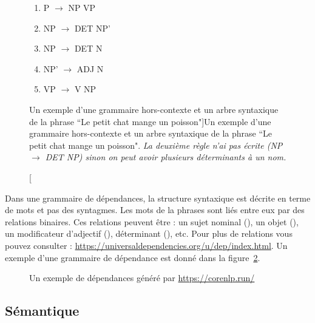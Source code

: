 \documentclass{KodeBook}
\begin{document}
\begin{figure}[ht]
	\centering
	\begin{minipage}{0.3\textwidth}
		\begin{enumerate}
			\item P $ \rightarrow $ NP VP
			\item NP $ \rightarrow $ DET NP'
			\item NP $ \rightarrow $ DET N
			\item NP' $ \rightarrow $ ADJ N
			\item VP $ \rightarrow $ V NP
		\end{enumerate}
	\end{minipage}
	\begin{minipage}{0.3\textwidth}
	\end{minipage}

	\caption[Un exemple d'une grammaire hors-contexte et un arbre syntaxique de la phrase ``Le petit chat mange un poisson"]{Un exemple d'une grammaire hors-contexte et un arbre syntaxique de la phrase ``Le petit chat mange un poisson". \textit{La deuxième règle n'ai pas écrite (NP $ \rightarrow $ DET NP) sinon on peut avoir plusieurs déterminants à un nom.}\label{fig.exp-gram-const}}

\end{figure}

Dans une grammaire de dépendances, la structure syntaxique est décrite en terme de mots et pas des syntagmes.
Les mots de la phrases sont liés entre eux par des relations binaires. 
Ces relations peuvent être : un sujet nominal (), un objet (), un modificateur d'adjectif (), déterminant (), etc.
Pour plus de relations vous pouvez consulter : \url{https://universaldependencies.org/u/dep/index.html}.
Un exemple d'une grammaire de dépendance est donné dans la figure~\ref{fig:exp-gram-dep}.

\begin{figure}[ht]
	\centering
	\caption{Un exemple de dépendances généré par \url{https://corenlp.run/} \label{fig:exp-gram-dep}}
\end{figure}

\subsection{Sémantique}
\end{document}
